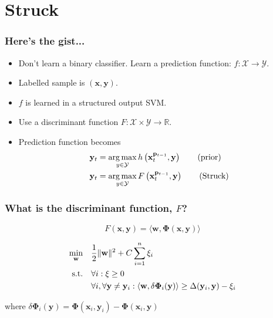 \section{Struck}

\begin{frame}
    \frametitle{Here's the gist...}
    \begin{itemize}
        \item Don't learn a binary classifier. Learn a prediction function: \(f :
            \mathcal{X} \rightarrow \mathcal{Y}\).
        \item Labelled sample is \((\mathbf{x}, \mathbf{y})\).
        \item \(f\) is learned in a structured output SVM.
        \item Use a discriminant function \(F: \mathcal{X} \times \mathcal{Y}
            \rightarrow \mathbb{R}\).
        \item Prediction function becomes %
            \begin{align}
                \mathbf{y}_t &= \operatorname*{arg\,max}\limits_{y \in \mathcal{Y}} h \left( \mathbf{x}_t^{\mathbf{p}_{t-1}}, \mathbf{y} \right) \tag{prior} \\
                \mathbf{y}_t &= \operatorname*{arg\,max}\limits_{y \in \mathcal{Y}} F \left( \mathbf{x}_t^{\mathbf{p}_{t-1}}, \mathbf{y} \right) \tag{Struck}
            \end{align}
    \end{itemize}
\end{frame}

\begin{frame}
    \frametitle{What is the discriminant function, \(F\)?}
    \begin{equation}
        F(\mathbf{x}, \mathbf{y}) = \langle \mathbf{w}, \mathbf{\Phi}(\mathbf{x}, \mathbf{y})\rangle
    \end{equation}

    \begin{equation} \label{eq:minimizing_hyperplane}
        \begin{aligned}
            \min_{\mathbf{w}} \quad & \frac{1}{2} \|\mathbf{w}\|^2 + C \sum_{i=1}^n \xi_i \\
            \operatorname{\text{s.t.} \quad} & \forall i : \xi \ge 0 \\
                & \forall i, \forall \mathbf{y} \ne \mathbf{y}_i : \langle \mathbf{w}, \delta \mathbf{\Phi}_i (\mathbf{y}) \rangle \ge \Delta (\mathbf{y}_i, \mathbf{y}) - \xi_i
        \end{aligned}
    \end{equation}

    where \( \delta \mathbf{\Phi}_i (\mathbf{y}) = \mathbf{\Phi}(\mathbf{x}_i, \mathbf{y}_i) - \mathbf{\Phi}(\mathbf{x}_i, \mathbf{y}) \)
\end{frame}

